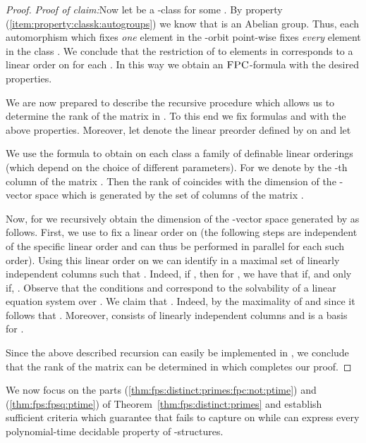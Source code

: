 \documentclass[a4paper,UKenglish]{lipics}
\newcommand{\logic}[1]{\ensuremath{\textsc{#1}}\xspace}
\newcommand{\FPC}{\logic{FPC}}
\theoremstyle{plain}
\newenvironment{claimproof}[1]{\par\noindent\textit{Proof of 
claim:}\space#1}
{\leavevmode\unskip\penalty9999 \hbox{}\nobreak\hfill\quad\hbox{
}}
\begin{document}
\begin{proof}
\begin{claimproof}
Now let  be a -class for some . 
By property (\ref{item:property:classk:autogroups}) we know that 
 is an Abelian group. Thus, each automorphism  which fixes \emph{one} element in the 
-orbit  point-wise 
fixes \emph{every} element in the class . 
We conclude that the restriction of  to elements in  corresponds to a linear order on  for each .
In this way we obtain an \FPC-formula  with the desired 
properties.
\end{claimproof}

\smallskip
We are now prepared to describe the recursive procedure which allows us to 
determine the rank of the matrix  in .
To this end we fix formulas  and  with the above 
properties. Moreover, let  denote the linear preorder defined by 
 on  and let

We use the formula  to obtain on each class  a 
family of definable linear orderings (which depend on the choice of 
different parameters).
For  we denote by  the -th column of 
the matrix . Then the rank of  coincides with the dimension of the 
-vector space which is generated by the set of columns  of the matrix .

Now, for  we recursively obtain the 
dimension  of the -vector space generated by 
 as 
follows.
First, we use  to fix a linear order on  (the following 
steps are independent of the specific linear order and can thus be 
performed in parallel for each such order).
Using this linear order on  we can identify in  a maximal 
set 
 of linearly independent columns 
such that .
Indeed, if , then 
for , 
we have that 
 if, and only if, . Observe 
that the conditions  and  correspond to the solvability of a linear equation system 
over .
We claim that . Indeed, by the 
maximality of  and since  it follows that . Moreover,  consists of linearly independent 
columns and is a basis for .

Since the above described recursion can easily be implemented in 
, we conclude that the rank  of the matrix  can be 
determined in  which completes our proof.
\end{proof}


\bigskip
We now focus on the parts 
(\ref{thm:fps:distinct:primes:fpc:not:ptime})
and 
(\ref{thm:fps:fpsq:ptime})
of Theorem~\ref{thm:fps:distinct:primes} and establish sufficient criteria 
which guarantee that  fails to capture  on 
 while  can express every polynomial-time decidable 
property of -structures.
\end{document}
